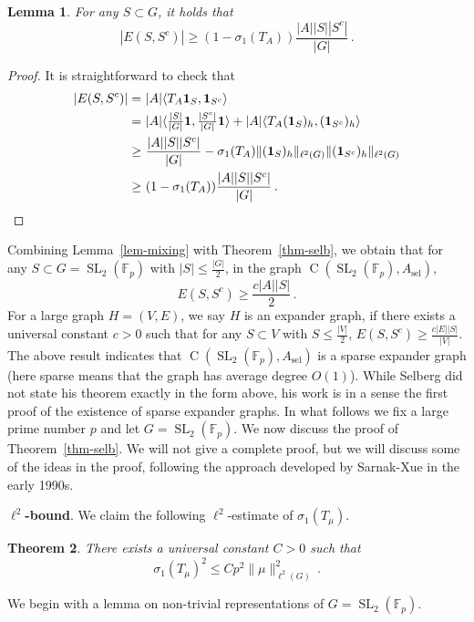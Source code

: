 \documentclass[12pt]{amsart}
\newtheorem{theorem}{Theorem}[section]
\newtheorem{lemma}[theorem]{Lemma}
\newcommand{\F}{\mathbb{F}}
\begin{document}
\begin{lemma}\label{lem-expansion}
    For any $S\subset G$, it holds that
    \[
    |E(S,S^c)|\ge (1-\sigma_1(T_A))\frac{|A||S||S^c|}{|G|}\,.
    \]
\end{lemma}
\begin{proof}
    It is straightforward to check that
    \begin{align*}
    |E(S,S^c)|=&\ |A|\langle T_A\mathbf{1}_S,\mathbf{1}_{S^c}\rangle\\
    =&\ |A|\langle\tfrac{|S|}{|G|}\mathbf{1},\tfrac{|S^c|}{|G|}\mathbf{1}\rangle+|A|\langle T_A(\mathbf{1}_S)_h,(\mathbf{1}_{S^c})_h\rangle\\
    \ge&\ \frac{|A||S||S^c|}{|G|}-\sigma_1(T_A)\|(\mathbf{1}_S)_h\|_{\ell^2(G)}\|(\mathbf{1}_{S^c})_h\|_{\ell^2(G)}\\
    \ge&\ (1-\sigma_1(T_A))\frac{|A||S||S^c|}{|G|}\,.\qedhere
    \end{align*}
\end{proof}
Combining Lemma~\ref{lem-mixing} with Theorem~\ref{thm-selb}, we obtain that for any $S\subset G=\operatorname{SL}_2(\F_p)$ with $|S|\le \tfrac{|G|}{2}$, in the graph $\operatorname{C}(\operatorname{SL}_2(\F_p),A_{\operatorname{sel}})$,
\[
E(S,S^c)\ge \frac{c|A||S|}{2}\,.
\]
For a large graph $H=(V,E)$, we say $H$ is an expander graph, if there exists a universal constant $c>0$ such that for any $S\subset V$ with $S\le \tfrac{|V|}{2}$, $E(S,S^c)\ge \frac{c|E||S|}{|V|}$. The above result indicates that $\operatorname{C}(\operatorname{SL}_2(\F_p),A_{\operatorname{sel}})$ is a sparse expander graph (here sparse means that the graph has average degree $O(1)$).
While Selberg did not state his theorem exactly in the form above,  his work is in a sense the first proof of the existence of sparse expander graphs.
In what follows we fix a large prime number $p$ and let $G=\operatorname{SL}_2(\F_p)$.   We now discuss the proof of Theorem~\ref{thm-selb}.   We will not give a complete proof,  but we will discuss some of the ideas in the proof,  following the approach developed by Sarnak-Xue in the early 1990s.

\textbf{$\ell^2$-bound}. 
We claim the following $\ell^2$-estimate of $\sigma_1(T_\mu)$. 
\begin{theorem}\label{thm-ell^2}
    There exists a universal constant $C>0$ such that
    \[
    \sigma_1(T_\mu)^2\le Cp^2\|\mu\|^2_{\ell^2(G)}\,.
    \]
\end{theorem}

We begin with a lemma on non-trivial representations of $G=\operatorname{SL}_2(\F_p)$.
\end{document}

